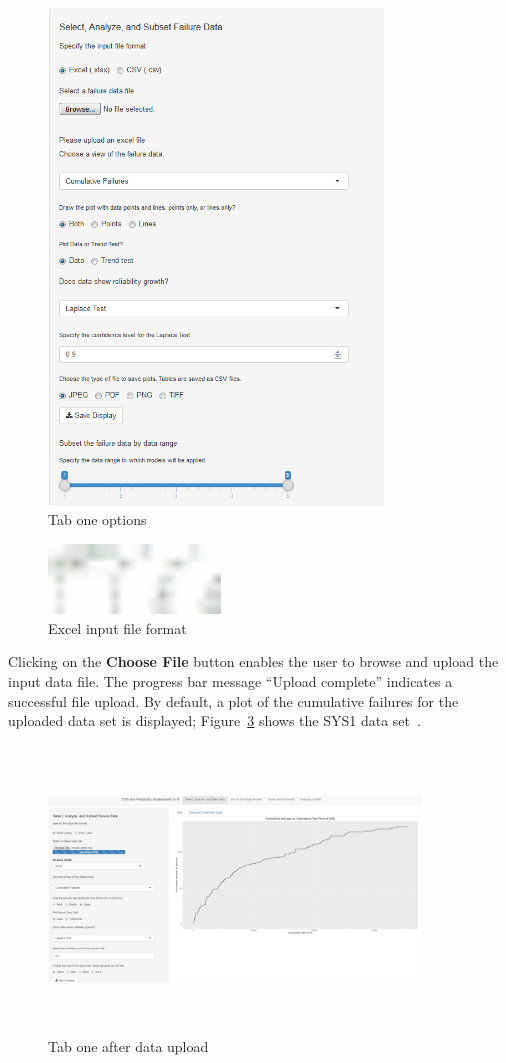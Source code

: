 \documentclass[journal]{IEEEtran}
\begin{document}
\begin{figure}[!h]
\centering
\includegraphics[width=3.5in]{Figures/Fig2}
\caption{Tab one options}
\label{fig_Tab1_leftCol}
\end{figure}

\begin{figure}[!h]
\centering
\includegraphics[width=1.8in]{Figures/sys1excel}
\caption{Excel input file format}
\label{fig_Excel_sys1}
\end{figure}

Clicking on the \textbf{Choose File} button enables the user to browse and upload the input data file. The progress bar message ``Upload complete'' indicates a successful file upload. By default, a plot of the cumulative failures for the uploaded data set is displayed; Figure~\ref{fig_Tab1_CDF} shows the SYS1 data set~\cite{BookHoSRE}.

\begin{figure}[!h]
\centering
\includegraphics[width=3.9in, height=3in]{Figures/Fig4}
\caption{Tab one after data upload}
\label{fig_Tab1_CDF}
\end{figure}
\end{document}

